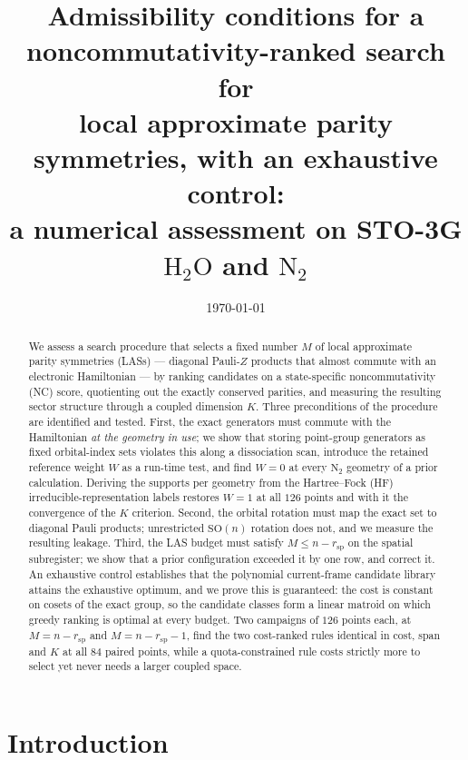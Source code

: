 \documentclass[11pt]{article}
\title{Admissibility conditions for a noncommutativity-ranked search for\\
local approximate parity symmetries, with an exhaustive control:\\
a numerical assessment on STO-3G $\mathrm{H_2O}$ and $\mathrm{N_2}$}
\author{}
\date{\today}
\newcommand{\rsp}{r_{\mathrm{sp}}}
\begin{document}
\maketitle

\begin{abstract}
\begin{sloppypar}
We assess a search procedure that selects a fixed number $M$ of local
approximate parity symmetries (LASs) --- diagonal Pauli-$Z$ products that
almost commute with an electronic Hamiltonian --- by ranking candidates on a
state-specific noncommutativity (NC) score, quotienting out the exactly
conserved parities, and measuring the resulting sector structure through a
coupled dimension $K$. Three preconditions of the procedure are identified and
tested. First, the exact generators must commute with the Hamiltonian
\emph{at the geometry in use}; we show that storing point-group generators as
fixed orbital-index sets violates this along a dissociation scan, introduce the
retained reference weight $W$ as a run-time test, and find $W=0$ at every
$\mathrm{N_2}$ geometry of a prior calculation. Deriving the supports per
geometry from the Hartree--Fock (HF) irreducible-representation labels restores
$W=1$ at all $126$ points and with it the convergence of the $K$ criterion.
Second, the orbital rotation must map the exact set to diagonal Pauli products;
unrestricted $\mathrm{SO}(n)$ rotation does not, and we measure the resulting
leakage. Third, the LAS budget must satisfy $M\le n-\rsp$ on the spatial
subregister; we show that a prior configuration exceeded it by one row, and
correct it. An exhaustive control establishes that the polynomial current-frame
candidate library attains the exhaustive optimum, and we prove this is
guaranteed: the cost is constant on cosets of the exact group, so the candidate
classes form a linear matroid on which greedy ranking is optimal at every
budget. Two campaigns of $126$ points each, at $M=n-\rsp$ and $M=n-\rsp-1$,
find the two cost-ranked rules identical in cost, span and $K$ at all $84$
paired points, while a quota-constrained rule costs strictly more to select
yet never needs a larger coupled space.
\end{sloppypar}
\end{abstract}

\section{Introduction}
\label{sec:intro}
\end{document}

